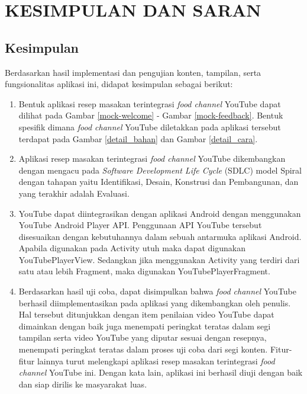 
\chapter{KESIMPULAN DAN SARAN}

\section{Kesimpulan}
	Berdasarkan hasil implementasi dan pengujian konten, tampilan, serta fungsionalitas aplikasi ini, didapat kesimpulan sebagai berikut:

	\begin{enumerate}
		\item Bentuk aplikasi resep masakan terintegrasi \textit{food channel} YouTube dapat dilihat pada Gambar \ref{mock-welcome} - Gambar \ref{mock-feedback}. Bentuk spesifik dimana \textit{food channel} YouTube diletakkan pada aplikasi tersebut terdapat pada Gambar \ref{detail_bahan} dan Gambar \ref{detail_cara}.
		
		\item Aplikasi resep masakan terintegrasi \textit{food channel} YouTube dikembangkan dengan mengacu pada \textit{Software Development Life Cycle} (SDLC) model Spiral dengan tahapan yaitu Identifikasi, Desain, Konstrusi dan Pembangunan, dan yang terakhir adalah Evaluasi.
		
		\item YouTube dapat diintegrasikan dengan aplikasi Android dengan menggunakan YouTube Android Player API. Penggunaan API YouTube tersebut disesuaikan dengan kebutuhannya dalam sebuah antarmuka aplikasi Android. Apabila digunakan pada Activity utuh maka dapat digunakan YouTubePlayerView. Sedangkan jika menggunakan Activity yang terdiri dari satu atau lebih Fragment, maka digunakan YouTubePlayerFragment. 

		\item Berdasarkan hasil uji coba, dapat disimpulkan bahwa \textit{food channel} YouTube berhasil diimplementasikan pada aplikasi yang dikembangkan oleh penulis. Hal tersebut ditunjukkan dengan item penilaian video YouTube dapat dimainkan dengan baik juga menempati peringkat teratas dalam segi tampilan serta video YouTube yang diputar sesuai dengan resepnya, menempati peringkat teratas dalam proses uji coba dari segi konten. Fitur-fitur lainnya turut melengkapi aplikasi resep masakan terintegrasi \textit{food channel} YouTube ini. Dengan kata lain, aplikasi ini berhasil diuji dengan baik dan siap dirilis ke masyarakat luas. 
	\end{enumerate}


